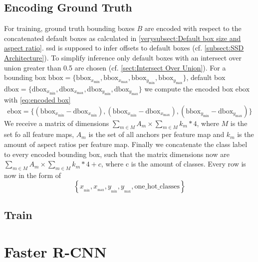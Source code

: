 \subsection{Encoding Ground Truth} For training, ground truth bounding boxes \(B\)
are encoded with respect to the concatenated default boxes as calculated in
\autoref{verysubsect:Default box size and aspect ratio}. \gls{ssd} is supposed
to infer offsets to default boxes (cf. \autoref{subsect:SSD Architecture}). To
simplify inference only default boxes with an intersect over union greater than
0.5 are chosen (cf. \autoref{sect:Intersect Over Union}). For a bounding box
\(\text{bbox}=\{\text{bbox}_{x_\text{min}}, \text{bbox}_{x_\text{max}}, \text{bbox}_{y_\text{min}}, \text{bbox}_{y_\text{max}}\}\), default box
\(\text{dbox}=\{\text{dbox}_{x_\text{min}}, \text{dbox}_{x_\text{max}}, \text{dbox}_{y_\text{min}}, \text{dbox}_{y_\text{max}}\}\) we compute the
encoded box \(\text{ebox}\) with \autoref{eq:encoded box}
\begin{equation}
    \text{ebox}=\{(\text{bbox}_{x_\text{min}}-\text{dbox}_{x_\text{min}}), (\text{bbox}_{x_\text{min}}-\text{dbox}_{x_\text{max}}), (\text{bbox}_{y_\text{min}}-\text{dbox}_{y_\text{max}})\}
\end{equation}\label{eq:encoded box}
We receive a matrix of dimensions \(\sum_{m\in M}{A_m}\times \sum_{m\in M}{k_m*4}\),
where \(M\) is the set fo all feature maps, \(A_m\) is the set of all anchors per
feature map and \(k_m\) is the amount of aspect ratios per feature map. Finally
we concatenate the class label to every encoded bounding box, such that the matrix
dimensions now are \(\sum_{m\in M}{A_m}\times \sum_{m\in M}{k_m*4+c}\), where c
is the amount of classes. Every row is now in the form of
\begin{equation}
    \left\{x_{_\text{min}}, x_{_\text{max}}, y_{_\text{min}}, y_{_\text{max}}, \text{one\_hot\_classes} \right\}
\end{equation}

\subsection{Train}
\blindtext[1]

\section{Faster R-CNN}
\blindtext[1]


